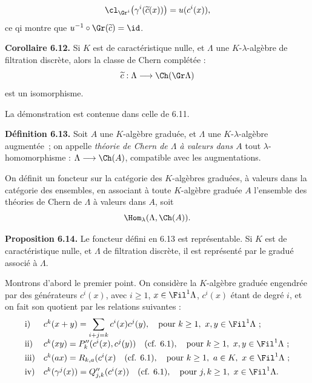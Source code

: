 \[
  \cl_{\Gr^i}\bigl(\gamma^i(\widetilde c(x))\bigr)=u(c^i(x)),
\]
ce q\hphantom{u}i
montre que \(u^{-1}\circ\Gr(\widetilde c)=\id\).

\textbf{Corollaire 6.12.} Si \(K\) est de caractéristique nulle, et \(\Lambda\) une \(K\)-\(\lambda\)-algèbre de filtration discrète, alors la classe de Chern complétée :
\[
  \widetilde c:\Lambda\longrightarrow \Ch(\Gr\Lambda)
\]
est un isomorphisme.

La démonstration est contenue dans celle de 6.11.

\textbf{Définition 6.13.} Soit \(A\) une \(K\)-algèbre graduée, et \(\Lambda\) une \(K\)-\(\lambda\)-algèbre augmentée~; on appelle \emph{théorie de Chern de \(\Lambda\) à valeurs dans \(A\)} tout \(\lambda\)-homomorphisme : \(\Lambda\longrightarrow \Ch(A)\), compatible avec les augmentations.

On définit un foncteur sur la catégorie des \(K\)-algèbres graduées, à valeurs dans la catégorie des ensembles, en associant à toute \(K\)-algèbre graduée \(A\) l'ensemble des théories de Chern de \(\Lambda\) à valeurs dans \(A\), soit
\[
  \Hom_\lambda(\Lambda,\Ch(A)).
\]

\textbf{Proposition 6.14.} Le foncteur défini en 6.13 est représentable. Si \(K\) est de caractéristique nulle, et \(\Lambda\) de filtration discrète, il est représenté par le gradué associé à \(\Lambda\).

Montrons d'abord le premier point. On considère la \(K\)-algèbre graduée engendrée par des générateurs \(c^i(x)\), avec \(i\ge1\), \(x\in\Fil^1\Lambda\), \(c^i(x)\) étant de degré \(i\), et on fait son quotient par les relations suivantes :
\[
\begin{array}{ll}
\text{i)}&
 c^k(x+y)=\displaystyle\sum_{i+j=k}c^i(x)c^j(y),
 \quad\text{pour } k\ge1,\ x,y\in\Fil^1\Lambda\ ;\\[0.8em]
\text{ii)}&
 c^k(xy)=P''_k(c^i(x),c^j(y))
 \quad(\text{cf. }6.1),
 \quad\text{pour } k\ge1,\ x,y\in\Fil^1\Lambda\ ;\\[0.4em]
\text{iii)}&
 c^k(ax)=R_{k,a}(c^i(x)
 \quad(\text{cf. }6.1),
 \quad\text{pour } k\ge1,\ a\in K,\ x\in\Fil^1\Lambda\ ;\\[0.4em]
\text{iv)}&
 c^k(\gamma^j(x))=Q''_{j,k}(c^i(x))
 \quad(\text{cf. }6.1),
 \quad\text{pour } j,k\ge1,\ x\in\Fil^1\Lambda.
\end{array}
\]
